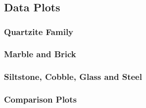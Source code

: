 
\section*{}
\doublespacing
\thispagestyle{empty}       %
\begin{center}
\vspace{20mm}
\subsection{Data Plots}
\vspace{30mm}
\subsubsection{Quartzite Family}
\subsubsection{Marble and Brick}
\subsubsection{Siltstone, Cobble, Glass and Steel}
\subsubsection{Comparison Plots}
\end{center}